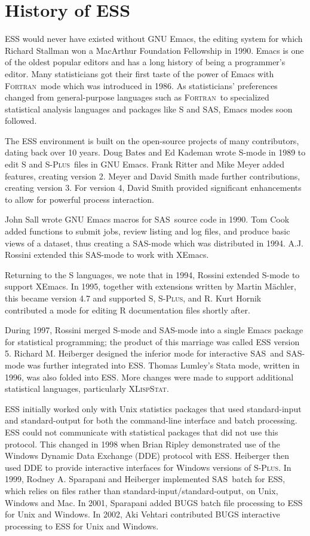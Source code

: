 \documentclass{article}
\newcommand*{\SAS}{\textsc{SAS}}
\newcommand*{\Splus}{\textsc{S-Plus}}
\newcommand*{\XLispStat}{\textsc{XLispStat}}
\newcommand*{\Fortran}{\textsc{Fortran}}
\begin{document}
\section{History of ESS}
\label{sec:ESS:history}

ESS would never have existed without GNU Emacs, the editing system for
which Richard Stallman won a MacArthur Foundation Fellowship in 1990.
Emacs is one of the oldest popular editors and has a long history of
being a programmer's editor.  Many statisticians got their first taste
of the power of Emacs with \Fortran\ mode which was introduced in
1986.  As statisticians' preferences changed from general-purpose
languages such as \Fortran\ to specialized statistical analysis
languages and packages like S and \SAS, Emacs modes soon followed.

The ESS environment is built on the open-source projects of many
contributors, dating back over 10 years.  Doug Bates and Ed Kademan
wrote S-mode in 1989 to edit S and \Splus\ files in GNU Emacs.  Frank
Ritter and Mike Meyer added features, creating version 2.  Meyer and
David Smith made further contributions, creating version 3.  For
version 4, David Smith provided significant enhancements to allow for
powerful process interaction.

John Sall wrote GNU Emacs macros for \SAS\ source code in 1990.  Tom
Cook added functions to submit jobs, review listing and log files, and
produce basic views of a dataset, thus creating a SAS-mode which was
distributed in 1994.  A.J. Rossini extended this SAS-mode to work with
XEmacs.

Returning to the S languages, we note that in 1994, Rossini extended
S-mode to support XEmacs.  In 1995, together with extensions written
by Martin M{\"a}chler, this became version 4.7 and supported S, \Splus,
and R.  Kurt Hornik contributed a mode for editing R documentation
files shortly after.

During 1997, Rossini merged S-mode and SAS-mode into a single Emacs
package for statistical programming; the product of this marriage was
called ESS version 5.  Richard M. Heiberger designed the inferior mode
for interactive \SAS\ and SAS-mode was further integrated into ESS.
Thomas Lumley's Stata mode, written in 1996, was also folded into ESS.
More changes were made to support additional statistical languages,
particularly \XLispStat.

ESS initially worked only with Unix statistics packages that used
standard-input and standard-output for both the command-line interface
and batch processing.  ESS could not communicate with statistical
packages that did not use this protocol.  This changed in 1998 when
Brian Ripley demonstrated use of the Windows Dynamic Data Exchange
(DDE) protocol with ESS.  Heiberger then used DDE to provide
interactive interfaces for Windows versions of \Splus.  In 1999,
Rodney A. Sparapani and Heiberger implemented \SAS\ batch for ESS,
which relies on files rather than standard-input/standard-output, on
Unix, Windows and Mac.  In 2001, Sparapani added BUGS batch file
processing to ESS for Unix and Windows.  In 2002, Aki Vehtari
contributed BUGS interactive processing to ESS for Unix and Windows.
\end{document}
